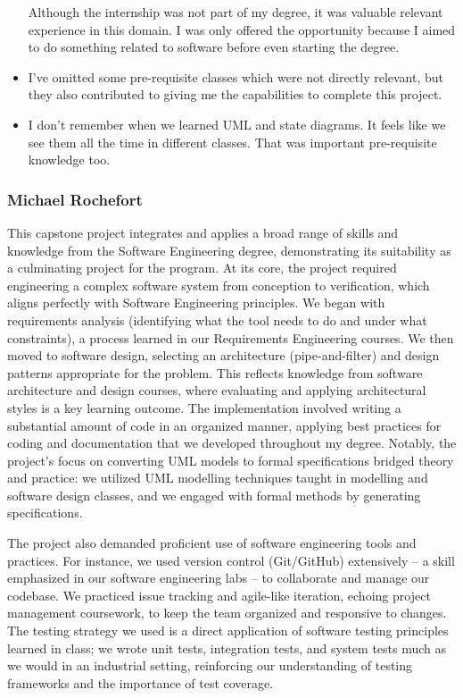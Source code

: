 \begin{itemize}
    Although the internship was not part of my degree, it was valuable relevant experience in this domain.
    I was only offered the opportunity because I aimed to do something related to software before even starting the degree.
    \item I've omitted some pre-requisite classes which were not directly relevant,
    but they also contributed to giving me the capabilities to complete this project.
    \item I don't remember when we learned UML and state diagrams.
    It feels like we see them all the time in different classes.
    That was important pre-requisite knowledge too.
\end{itemize}


\subsubsection{Michael Rochefort}\label{subsubsec:mike-deg}

This capstone project integrates and applies a broad range of skills and knowledge from the Software Engineering degree, demonstrating its suitability as a culminating project for the program. At its core, the project required engineering a complex software system from conception to verification, which aligns perfectly with Software Engineering principles. We began with requirements analysis (identifying what the tool needs to do and under what constraints), a process learned in our Requirements Engineering courses. We then moved to software design, selecting an architecture (pipe-and-filter) and design patterns appropriate for the problem. This reflects knowledge from software architecture and design courses, where evaluating and applying architectural styles is a key learning outcome. The implementation involved writing a substantial amount of code in an organized manner, applying best practices for coding and documentation that we developed throughout my degree. Notably, the project’s focus on converting UML models to formal specifications bridged theory and practice: we utilized UML modelling techniques taught in modelling and software design classes, and we engaged with formal methods by generating specifications.

The project also demanded proficient use of software engineering tools and practices. For instance, we used version control (Git/GitHub) extensively – a skill emphasized in our software engineering labs – to collaborate and manage our codebase. We practiced issue tracking and agile-like iteration, echoing project management coursework, to keep the team organized and responsive to changes. The testing strategy we used is a direct application of software testing principles learned in class; we wrote unit tests, integration tests, and system tests much as we would in an industrial setting, reinforcing our understanding of testing frameworks and the importance of test coverage.

